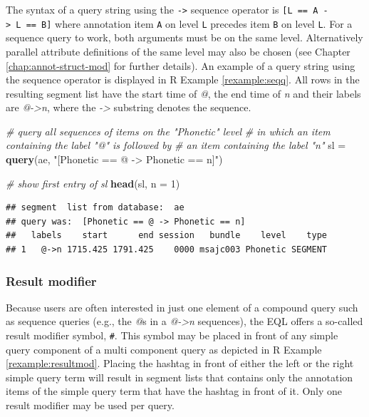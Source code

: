 \documentclass[]{book}
\newenvironment{Shaded}{\begin{snugshade}}{\end{snugshade}}
\newcommand{\CommentTok}[1]{\textcolor[rgb]{0.56,0.35,0.01}{\textit{#1}}}
\newcommand{\DataTypeTok}[1]{\textcolor[rgb]{0.13,0.29,0.53}{#1}}
\newcommand{\DecValTok}[1]{\textcolor[rgb]{0.00,0.00,0.81}{#1}}
\newcommand{\KeywordTok}[1]{\textcolor[rgb]{0.13,0.29,0.53}{\textbf{#1}}}
\newcommand{\NormalTok}[1]{#1}
\newcommand{\StringTok}[1]{\textcolor[rgb]{0.31,0.60,0.02}{#1}}
\theoremstyle{definition}
\theoremstyle{definition}
\theoremstyle{definition}
\theoremstyle{remark}
\begin{document}
The syntax of a query string using the \texttt{-\textgreater{}} sequence
operator is \texttt{{[}L\ ==\ A\ -\textgreater{}\ L\ ==\ B{]}} where
annotation item \texttt{A} on level \texttt{L} precedes item \texttt{B}
on level \texttt{L}. For a sequence query to work, both arguments must
be on the same level. Alternatively parallel attribute definitions of
the same level may also be chosen (see Chapter
\ref{chap:annot-struct-mod} for further details). An example of a query
string using the sequence operator is displayed in R Example
\ref{rexample:seqq}. All rows in the resulting segment list have the
start time of \emph{@}, the end time of \emph{n} and their labels are
\emph{@-\textgreater{}n}, where the \emph{-\textgreater{}} substring
denotes the sequence.

\begin{Shaded}
\begin{Highlighting}[]
\CommentTok{# query all sequences of items on the "Phonetic" level}
\CommentTok{# in which an item containing the label "@" is followed by}
\CommentTok{# an item containing the label "n"}
\NormalTok{sl =}\StringTok{ }\KeywordTok{query}\NormalTok{(ae, }\StringTok{"[Phonetic == @ -> Phonetic == n]"}\NormalTok{)}

\CommentTok{# show first entry of sl}
\KeywordTok{head}\NormalTok{(sl, }\DataTypeTok{n =} \DecValTok{1}\NormalTok{)}
\end{Highlighting}
\end{Shaded}

\begin{verbatim}
## segment  list from database:  ae 
## query was:  [Phonetic == @ -> Phonetic == n] 
##   labels    start      end session   bundle    level    type
## 1   @->n 1715.425 1791.425    0000 msajc003 Phonetic SEGMENT
\end{verbatim}

\hypertarget{result-modifier}{%
\subsubsection{Result modifier}\label{result-modifier}}

Because users are often interested in just one element of a compound
query such as sequence queries (e.g., the \emph{@}s in a
\emph{@-\textgreater{}n} sequences), the EQL offers a so-called result
modifier symbol, \texttt{\#}. This symbol may be placed in front of any
simple query component of a multi component query as depicted in R
Example \ref{rexample:resultmod}. Placing the hashtag in front of either
the left or the right simple query term will result in segment lists
that contains only the annotation items of the simple query term that
have the hashtag in front of it. Only one result modifier may be used
per query.
\end{document}
